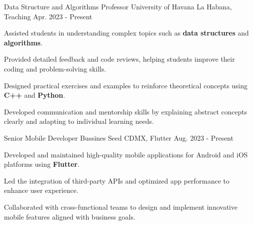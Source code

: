 \begin{cventries}
  \cventry
    {Data Structure and Algorithms Professor}
    {University of Havana}
    {La Habana, Teaching}
    {Apr. 2023 - Present}
    {
      \begin{cvitems}
        \item {Assisted students in understanding complex topics such as \textbf{data structures} and \textbf{algorithms}.}
        \item {Provided detailed feedback and code reviews, helping students improve their coding and problem-solving skills.}
        \item {Designed practical exercises and examples to reinforce theoretical concepts using \textbf{C++} and \textbf{Python}.}
        \item {Developed communication and mentorship skills by explaining abstract concepts clearly and adapting to individual learning needs.}
      \end{cvitems}
}
  \cventry
    {Senior Mobile Developer}
    {Bussines Seed}
    {CDMX, Flutter}
    {Aug. 2023 - Present}
    {
       \begin{cvitems}
        \item {Developed and maintained high-quality mobile applications for Android and iOS platforms using \textbf{Flutter}.}
        \item {Led the integration of third-party APIs and optimized app performance to enhance user experience.}
        \item {Collaborated with cross-functional teams to design and implement innovative mobile features aligned with business goals.}
      \end{cvitems}
    }
  \end{cventries}
